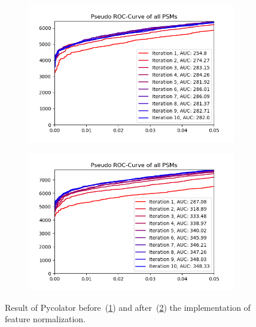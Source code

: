 \begin{figure}
	\normalsize
	\centering
	\begin{subfigure}{0.49\textwidth}
		\includegraphics[width = \textwidth]{figures/noNorming.png}
		\caption{}
		\label{fig:before_feature_normalization}
	\end{subfigure}
	\hfill
	\begin{subfigure}{0.49\textwidth}
		\includegraphics[width = \textwidth]{figures/norming.png}
		\caption{}
		\label{fig:after_feature_normalization}
	\end{subfigure}
	\caption[Results of implementing feature normalization]{Result of Pycolator before~(\ref{fig:before_feature_normalization}) and after~(\ref{fig:after_feature_normalization}) the implementation of feature normalization. }
	\label{fig:feature_normalization}
\end{figure}
\renewcommand{\baselinestretch}{1}


